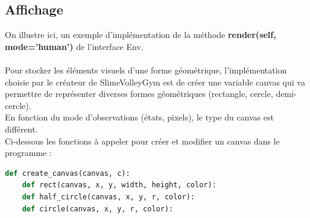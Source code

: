\documentclass[11pt, a4paper]{article}
\begin{document}
\subsection{\textbf{Affichage}} 

\noindent On illustre ici, un exemple d'implémentation de la méthode \textbf{render(self, mode='human')} de l'interface Env.\\\\ Pour stocker les éléments visuels d’une forme géométrique, 
l'implémentation choisie par le créateur de SlimeVolleyGym est de créer une variable canvas qui va permettre de représenter diverses
formes géométriques (rectangle, cercle, demi-cercle).\\
En fonction du mode d'observations (états, pixels), le type du canvas est différent. \\
Ci-dessous les fonctions à appeler pour créer et modifier un canvas dans le programme :\\
		
\begin{lstlisting}[language=python, frame=single, gobble=8, tabsize=4]	
	def create_canvas(canvas, c):
	def rect(canvas, x, y, width, height, color):
	def half_circle(canvas, x, y, r, color):
	def circle(canvas, x, y, r, color):
\end{lstlisting}
\end{document}
